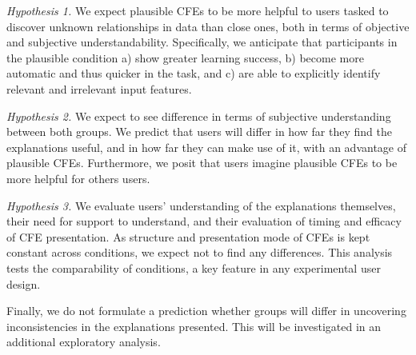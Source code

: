 \textit{Hypothesis 1.} We expect plausible \glspl{CFE} to be more helpful to users tasked to discover unknown relationships in data than close ones, both in terms of objective and subjective understandability. 
Specifically, we anticipate that participants in the plausible condition a) show greater learning success, b) become more automatic and thus quicker in the task, and c) are able to explicitly identify relevant and irrelevant input features.

\textit{Hypothesis 2.} We expect to see difference in terms of subjective understanding between both groups.
We predict that users will differ in how far they find the explanations useful, and in how far they can make use of it, with an advantage of plausible CFEs. %
Furthermore, we posit that users imagine plausible CFEs to be more helpful for others users. %

\textit{Hypothesis 3.} We evaluate users' understanding of the explanations themselves, their need for support to understand, and their evaluation of timing and efficacy of \gls{CFE} presentation. As structure and presentation mode of \glspl{CFE} is kept constant across conditions, we expect not to find any differences.
This analysis tests the comparability of conditions, a key feature in any experimental user design.

Finally, we do not formulate a prediction whether groups will differ in uncovering inconsistencies in the explanations presented. This will be investigated in an additional exploratory analysis.%

